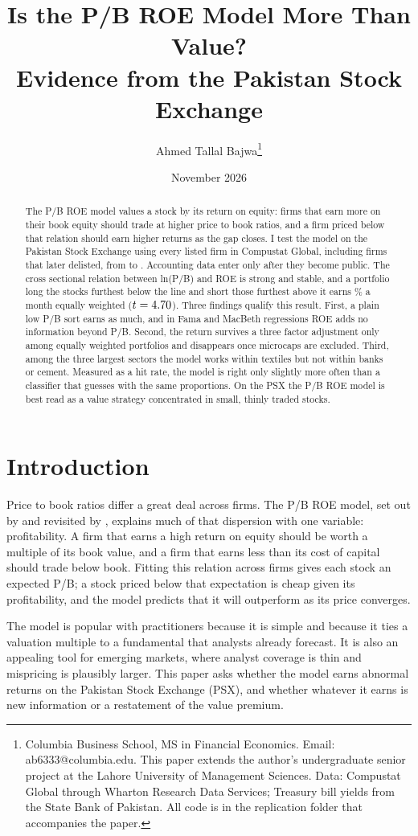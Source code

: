 \documentclass[11pt]{article}
\title{\textbf{Is the P/B ROE Model More Than Value?\\Evidence from the Pakistan Stock Exchange}}
\author{Ahmed Tallal Bajwa\thanks{Columbia Business School, MS in Financial Economics. Email: ab6333@columbia.edu.
This paper extends the author's undergraduate senior project at the Lahore University of Management Sciences.
Data: Compustat Global through Wharton Research Data Services; Treasury bill yields from the State Bank of Pakistan. All code is in the replication folder
that accompanies the paper.}}
\date{November 2026}
\begin{document}
\maketitle

\begin{abstract}
\noindent The P/B ROE model values a stock by its return on equity: firms that earn more on their book
equity should trade at higher price to book ratios, and a firm priced below that relation should
earn higher returns as the gap closes. I test the model on the Pakistan Stock Exchange using every
listed firm in Compustat Global, including \NDelisted{} firms that later delisted, from \FirstMonth{}
to \LastMonth{}. Accounting data enter only after they become public. The cross sectional relation
between ln(P/B) and ROE is strong and stable, and a portfolio long the stocks furthest below the
line and short those furthest above it earns \LSew{}\% a month equally weighted ($t = 4.70{}$).
Three findings qualify this result. First, a plain low P/B sort earns as much, and in Fama and
MacBeth regressions ROE adds no information beyond P/B. Second, the return survives a three factor
adjustment only among equally weighted portfolios and disappears once microcaps are excluded.
Third, among the three largest sectors the model works within textiles but not within banks or
cement. Measured as a hit rate, the model is right only slightly more often than a classifier that
guesses with the same proportions. On the PSX the P/B ROE model is best read as a value strategy concentrated
in small, thinly traded stocks.
\end{abstract}

\section{Introduction}

Price to book ratios differ a great deal across firms. The P/B ROE model, set out by
\citet{wilcox1984} and revisited by \citet{wilcoxphilips2005}, explains much of that dispersion with
one variable: profitability. A firm that earns a high return on equity should be worth a multiple of
its book value, and a firm that earns less than its cost of capital should trade below book. Fitting
this relation across firms gives each stock an expected P/B; a stock priced below that expectation is
cheap given its profitability, and the model predicts that it will outperform as its price converges.

The model is popular with practitioners because it is simple and because it ties a valuation
multiple to a fundamental that analysts already forecast. It is also an appealing tool for emerging
markets, where analyst coverage is thin and mispricing is plausibly larger. This paper asks whether
the model earns abnormal returns on the Pakistan Stock Exchange (PSX), and whether whatever it earns
is new information or a restatement of the value premium.
\end{document}
